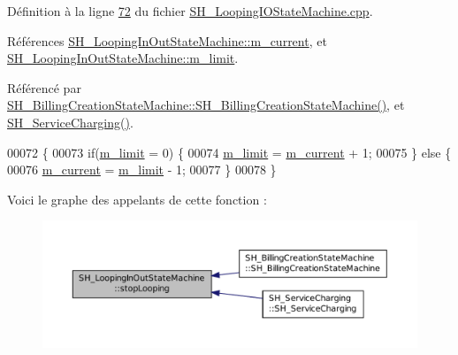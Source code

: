 Définition à la ligne \hyperlink{SH__LoopingIOStateMachine_8cpp_source_l00072}{72} du fichier \hyperlink{SH__LoopingIOStateMachine_8cpp_source}{S\-H\-\_\-\-Looping\-I\-O\-State\-Machine.\-cpp}.



Références \hyperlink{classSH__LoopingInOutStateMachine_af64f9f28a1b8e82bd9ee5f4b96a7c82e}{S\-H\-\_\-\-Looping\-In\-Out\-State\-Machine\-::m\-\_\-current}, et \hyperlink{classSH__LoopingInOutStateMachine_a818a60d3691fcac11323ad114c309dcb}{S\-H\-\_\-\-Looping\-In\-Out\-State\-Machine\-::m\-\_\-limit}.



Référencé par \hyperlink{classSH__BillingCreationStateMachine_ad62b77fa4aeafe200056ff3974562f83}{S\-H\-\_\-\-Billing\-Creation\-State\-Machine\-::\-S\-H\-\_\-\-Billing\-Creation\-State\-Machine()}, et \hyperlink{classSH__ServiceCharging_afa5273d046049b1c2b020a6a19a8290b}{S\-H\-\_\-\-Service\-Charging()}.


\begin{DoxyCode}
00072                                               \{
00073     \textcolor{keywordflow}{if}(\hyperlink{classSH__LoopingInOutStateMachine_a818a60d3691fcac11323ad114c309dcb}{m\_limit} = 0) \{
00074         \hyperlink{classSH__LoopingInOutStateMachine_a818a60d3691fcac11323ad114c309dcb}{m\_limit} = \hyperlink{classSH__LoopingInOutStateMachine_af64f9f28a1b8e82bd9ee5f4b96a7c82e}{m\_current} + 1;
00075     \} \textcolor{keywordflow}{else} \{
00076         \hyperlink{classSH__LoopingInOutStateMachine_af64f9f28a1b8e82bd9ee5f4b96a7c82e}{m\_current} = \hyperlink{classSH__LoopingInOutStateMachine_a818a60d3691fcac11323ad114c309dcb}{m\_limit} - 1;
00077     \}
00078 \}
\end{DoxyCode}


Voici le graphe des appelants de cette fonction \-:
\nopagebreak
\begin{figure}[H]
\begin{center}
\leavevmode
\includegraphics[width=350pt]{classSH__LoopingInOutStateMachine_a73d75e30318da22fec99387e9bf02a9b_icgraph}
\end{center}
\end{figure}


